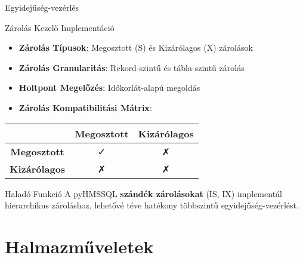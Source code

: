 \documentclass[aspectratio=169]{beamer}
\begin{document}
\begin{frame}{Egyidejűség-vezérlés}
\begin{block}{Zárolás Kezelő Implementáció}
\begin{itemize}
    \item \textbf{Zárolás Típusok}: Megosztott (S) és Kizárólagos (X) zárolások
    \item \textbf{Zárolás Granularitás}: Rekord-szintű és tábla-szintű zárolás
    \item \textbf{Holtpont Megelőzés}: Időkorlát-alapú megoldás
    \item \textbf{Zárolás Kompatibilitási Mátrix}:
\end{itemize}
\end{block}

\begin{center}
\begin{tabular}{|c|c|c|}
\hline
& \textbf{Megosztott} & \textbf{Kizárólagos} \\
\hline
\textbf{Megosztott} & ✓ & ✗ \\
\hline
\textbf{Kizárólagos} & ✗ & ✗ \\
\hline
\end{tabular}
\end{center}

\begin{alertblock}{Haladó Funkció}
A pyHMSSQL \textbf{szándék zárolásokat} (IS, IX) implementál hierarchikus zároláshoz, lehetővé téve hatékony többszintű egyidejűség-vezérlést.
\end{alertblock}
\end{frame}

\section{Halmazműveletek}
\end{document}
